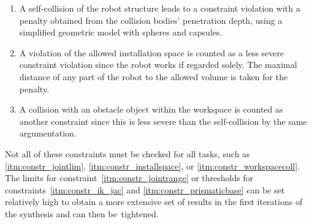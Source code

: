 \begin{enumerate}
  \item \label{itm:constr_selfcoll} A self-collision of the robot structure leads to a constraint violation with a penalty obtained from the collision bodies' penetration depth, using a simplified geometric model with spheres and capsules. %
  \item \label{itm:constr_installspace} A violation of the allowed installation space is counted as a less severe constraint violation since the robot works if regarded solely. The maximal distance of any part of the robot to the allowed volume is taken for the penalty. %
  \item \label{itm:constr_workspacecoll} A collision with an obstacle object within the workspace is counted as another constraint since this is less severe than the self-collision by the same argumentation.
\end{enumerate}
%
Not %
%
all of these constraints must be checked for all tasks, such as \ref*{itm:constr_jointlim}, \ref*{itm:constr_installspace}, or \ref*{itm:constr_workspacecoll}.
The limits for constraint~\ref*{itm:constr_jointrange} or thresholds for constraints~\ref*{itm:constr_ik_jac} and \ref*{itm:constr_prismaticbase} can be set relatively high to obtain a more extensive set of results in the first iterations of the synthesis and can then be~tightened.

